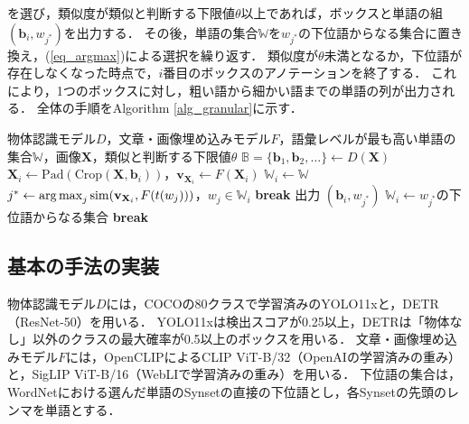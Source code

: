 \noindent
を選び，類似度が類似と判断する下限値$ \theta $以上であれば，ボックスと単語の組$ ({\mathbf b}_i, w_{j^\ast}) $を出力する．
その後，単語の集合$ {\mathbb W} $を$ w_{j^\ast} $の下位語からなる集合に置き換え，(\ref{eq_argmax})による選択を繰り返す．
類似度が$ \theta $未満となるか，下位語が存在しなくなった時点で，$ i $番目のボックスのアノテーションを終了する．
これにより，1つのボックスに対し，粗い語から細かい語までの単語の列が出力される．
全体の手順をAlgorithm \ref{alg_granular}に示す．

\begin{algorithm}[t]
    \caption{粒度可変アノテーション}
    \label{alg_granular}
    \begin{algorithmic}[1]
        \Require 物体認識モデル$ D $，文章・画像埋め込みモデル$ F $，語彙レベルが最も高い単語の集合$ {\mathbb W} $，画像$ {\mathbf X} $，類似と判断する下限値$ \theta $
        \State $ {\mathbb B} = \{ {\mathbf b}_1, {\mathbf b}_2, \ldots \} \gets D({\mathbf X}) $
            \State $ {\mathbf X}_i \gets \mathrm{Pad}(\mathrm{Crop}({\mathbf X}, {\mathbf b}_i)) $，$ {\mathbf v}_{{\mathbf X}_i} \gets F({\mathbf X}_i) $
            \State $ {\mathbb W}_i \gets {\mathbb W} $
            \Loop
                \State $ j^\ast \gets \operatorname*{arg\,max}_j \mathrm{sim}({\mathbf v}_{{\mathbf X}_i}, F(t(w_j))) $，$ w_j \in {\mathbb W}_i $
                    \State \textbf{break}
                \EndIf
                \State 出力 $ ({\mathbf b}_i, w_{j^\ast}) $
                \State $ {\mathbb W}_i \gets w_{j^\ast} $の下位語からなる集合
                    \State \textbf{break}
                \EndIf
            \EndLoop
        \EndFor
    \end{algorithmic}
\end{algorithm}

\subsection{基本の手法の実装}
物体認識モデル$ D $には，COCOの80クラスで学習済みのYOLO11x\cite{ref_YOLO11}と，DETR（ResNet-50）\cite{ref_DETR}を用いる．
YOLO11xは検出スコアが0.25以上，DETRは「物体なし」以外のクラスの最大確率が0.5以上のボックスを用いる．
文章・画像埋め込みモデル$ F $には，OpenCLIP\cite{ref_OpenCLIP}によるCLIP ViT-B/32（OpenAIの学習済みの重み）と，SigLIP ViT-B/16（WebLIで学習済みの重み）を用いる．
下位語の集合は，WordNetにおける選んだ単語のSynsetの直接の下位語とし，各Synsetの先頭のレンマを単語とする．

